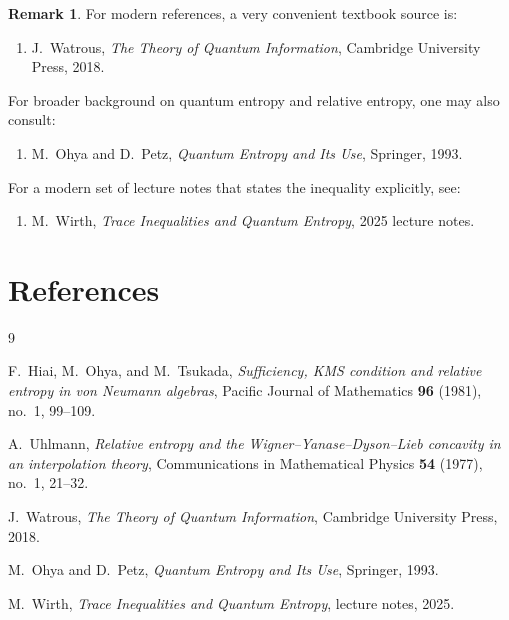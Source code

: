 \documentclass[11pt]{article}
\theoremstyle{definition}
\newtheorem{remark}{Remark}
\newcommand{\1}{\mathbf{1}}
\begin{document}
\begin{remark}
For modern references, a very convenient textbook source is:
\begin{enumerate}[label=(\arabic*)]
\item J.~Watrous, \emph{The Theory of Quantum Information}, Cambridge University Press, 2018.
\end{enumerate}
For broader background on quantum entropy and relative entropy, one may also consult:
\begin{enumerate}[label=(\arabic*)]
\item M.~Ohya and D.~Petz, \emph{Quantum Entropy and Its Use}, Springer, 1993.
\end{enumerate}
For a modern set of lecture notes that states the inequality explicitly, see:
\begin{enumerate}[label=(\arabic*)]
\item M.~Wirth, \emph{Trace Inequalities and Quantum Entropy}, 2025 lecture notes.
\end{enumerate}
\end{remark}

\section{References}

\begin{thebibliography}{9}

F.~Hiai, M.~Ohya, and M.~Tsukada,
\emph{Sufficiency, KMS condition and relative entropy in von Neumann algebras},
Pacific Journal of Mathematics \textbf{96} (1981), no.~1, 99--109.

A.~Uhlmann,
\emph{Relative entropy and the Wigner--Yanase--Dyson--Lieb concavity in an interpolation theory},
Communications in Mathematical Physics \textbf{54} (1977), no.~1, 21--32.

J.~Watrous,
\emph{The Theory of Quantum Information},
Cambridge University Press, 2018.

M.~Ohya and D.~Petz,
\emph{Quantum Entropy and Its Use},
Springer, 1993.

M.~Wirth,
\emph{Trace Inequalities and Quantum Entropy},
lecture notes, 2025.

\end{thebibliography}
\end{document}
